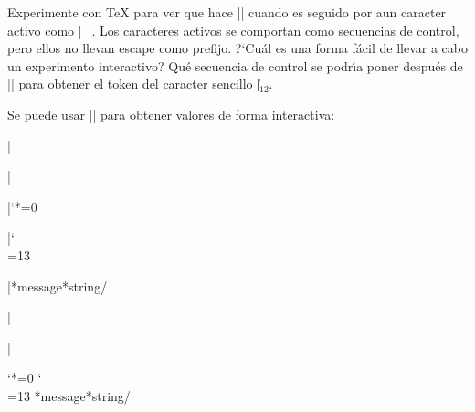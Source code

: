 

\bigskip

\enunciadoS Experimente con {\TeX} para ver que hace |\string| cuando
es seguido por aun caracter activo como |~|. Los caracteres activos se
comportan como secuencias de control, pero ellos no llevan escape como
prefijo. ?`Cu\'al es una forma f\'acil de llevar a cabo un experimento
interactivo? Qu\'e secuencia de control se podr\'{\i}a poner despu\'es
de |\string| para obtener el token del caracter sencillo |\|$_{12}$.

\bigskip

\respuestaS Se puede usar |\message| para obtener valores de forma
interactiva:

\medskip

\noindent|\message{\string~} %
\message{\string~} %

\medskip

\noindent|{ %

\noindent|\catcode`*=0 %

\noindent|\catcode`\\=13 %

\noindent|*message{*string/} %

\noindent|}|




{ %
 \catcode`*=0 %
 \catcode`\\=13 %
 *message{*string/} %
 }
\bye

